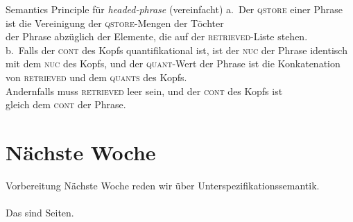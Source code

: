\begin{frame}
  {Semantics Principle für \textit{headed-phrase} (vereinfacht)}
  \onslide<+->
  \onslide<+->
  \centering 
  \Zeile
  a.~Der \textsc{qstore} einer Phrase ist die Vereinigung der \textsc{qstore}-Mengen der Töchter\\
  der Phrase abzüglich der Elemente, die auf der \textsc{retrieved}-Liste stehen.\\
  \onslide<+->
  \Zeile
  b.~\alert{Falls} der \textsc{cont} des Kopfs quantifikational ist, ist der \textsc{nuc} der Phrase identisch\\
  mit dem \textsc{nuc} des Kopfs, und der \textsc{quant}-Wert der Phrase ist die Konkatenation\\
  von \textsc{retrieved} und dem \textsc{quants} des Kopfs.\\
  \onslide<+->
  \Halbzeile
  \alert{Andernfalls} muss \textsc{retrieved} leer sein, und der \textsc{cont} des Kopfs ist\\
  gleich dem \textsc{cont} der Phrase.
\end{frame}

\section{Nächste Woche}

\begin{frame}
  {Vorbereitung}
  \centering 
  \large
  Nächste Woche reden wir über Unterspezifikationssemantik.\\
  \Zeile
  \\
  \Viertelzeile
  Das sind  Seiten.\\
\end{frame}
